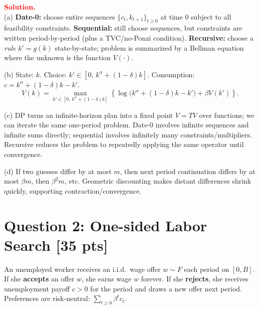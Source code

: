 \documentclass[12pt]{article}
\newenvironment{sol}{\par\smallskip\noindent \textcolor{red}{\textbf{Solution.}} \\ }{\par\medskip}
\newcommand{\pts}[1]{\hfill{\small[#1 pts]}}
\begin{document}
\begin{sol}
(a) \textbf{Date-0:} choose entire sequences \(\{c_t,k_{t+1}\}_{t\ge0}\) at time 0 subject to all feasibility constraints.
\textbf{Sequential:} still choose sequences, but constraints are written period-by-period (plus a TVC/no-Ponzi condition).
\textbf{Recursive:} choose a \emph{rule} \(k'=g(k)\) state-by-state; problem is summarized by a Bellman equation where the
unknown is the function \(V(\cdot)\).

(b) State: \(k\). Choice: \(k'\in[0,\,k^\alpha+(1-\delta)k]\). Consumption: \(c=k^\alpha+(1-\delta)k-k'\).
\[
V(k)=\max_{k'\in[0,\,k^\alpha+(1-\delta)k]}
\left\{\log\!\big(k^\alpha+(1-\delta)k-k'\big)+\beta V(k')\right\}.
\]

(c) DP turns an infinite-horizon plan into a fixed point \(V=TV\) over functions; we can iterate the same one-period problem.
Date-0 involves infinite sequences and infinite sums directly; sequential involves infinitely many constraints/multipliers.
Recursive reduces the problem to repeatedly applying the same operator until convergence.

(d) If two guesses differ by at most \(m\), then next period continuation differs by at most \(\beta m\), then \(\beta^2 m\), etc.
Geometric discounting makes distant differences shrink quickly, supporting contraction/convergence.
\end{sol}

\section*{Question 2: One-sided Labor Search \pts{35}}

An unemployed worker receives an i.i.d.\ wage offer \(w\sim F\) each period on \([0,B]\).
If she \textbf{accepts} an offer \(w\), she earns wage \(w\) forever.
If she \textbf{rejects}, she receives unemployment payoff \(c>0\) for the period and draws a new offer next period.
Preferences are risk-neutral: \(\sum_{t\ge0}\beta^t c_t\).
\end{document}
